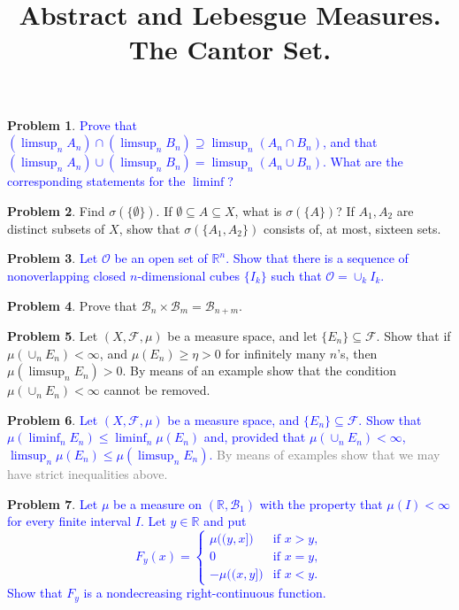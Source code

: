 \documentclass[12pt]{amsart}
\def\field#1{\mathbb{#1}}
\theoremstyle{definition}
\newtheorem{problem}{Problem}
\theoremstyle{remark}
\begin{document}
\title{Abstract and Lebesgue Measures. The Cantor Set.}
\maketitle

\begin{problem}
  \textcolor{blue}{Prove that $(\limsup_n A_n) \cap (\limsup_n B_n)
    \supseteq \limsup_n (A_n \cap B_n)$, and that $(\limsup_n A_n)
    \cup (\limsup_n B_n) = \limsup_n (A_n \cup B_n)$.  What are the
    corresponding statements for the $\liminf$?}
\end{problem}
\begin{problem}
  Find $\sigma(\{ \emptyset \})$.  If $\emptyset \subseteq A \subseteq
  X$, what is $\sigma(\{ A \})$? If $A_1, A_2$ are distinct subsets of
  $X$, show that $\sigma(\{ A_1, A_2 \})$ consists of, at most,
  sixteen sets.
\end{problem}
\begin{problem}
  \textcolor{blue}{ Let $\mathcal{O}$ be an open set of $\field{R}^n$.
    Show that there is a sequence of nonoverlapping closed
    $n$-dimensional cubes $\{ I_k \}$ such that $\mathcal{O} = \cup_k
    I_k$.}
\end{problem}
\begin{problem}
  Prove that $\mathcal{B}_n \times \mathcal{B}_m = \mathcal{B}_{n+m}$.
\end{problem}
\begin{problem}
  Let $(X, \mathcal{F}, \mu)$ be a measure space, and let $\{ E_n \}
  \subseteq \mathcal{F}$.  Show that if $\mu(\cup_n E_n) < \infty$,
  and $\mu( E_n ) \geq \eta >0$ for infinitely many $n$'s, then
  $\mu(\limsup_n E_n) > 0$.  By means of an example show that the
  condition $\mu( \cup_n E_n) < \infty$ cannot be removed.
\end{problem}
\begin{problem}
  \textcolor{blue}{ Let $(X, \mathcal{F}, \mu)$ be a measure space,
    and $\{ E_n \} \subseteq \mathcal{F}$.  Show that $\mu(\liminf_n
    E_n) \leq \liminf_n \mu(E_n)$ and, provided that $\mu(\cup_n E_n)
    < \infty$, $\limsup_n \mu(E_n) \leq \mu(\limsup_n E_n)$.}
  \textcolor{gray}{By means of examples show that we may have strict
    inequalities above.}
\end{problem}
\begin{problem}
  \textcolor{blue}{Let $\mu$ be a measure on $(\field{R},
    \mathcal{B}_1)$ with the property that $\mu(I) < \infty$ for every
    finite interval $I$.  Let $y \in \field{R}$ and put
    \begin{equation*}
      F_y(x) = \begin{cases}
        \mu\big( (y,x] \big) &\text{if } x>y, \\
        0 &\text{if } x=y, \\
        -\mu\big( (x,y] \big) &\text{if } x<y.
      \end{cases}
    \end{equation*}
    Show that $F_y$ is a nondecreasing right-continuous function.}
\end{problem}
\end{document}
